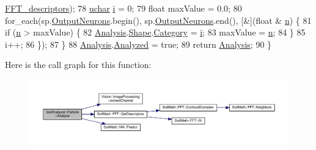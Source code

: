 \begin{DoxyCode}
      \hyperlink{class_shape_classification_afecc3c98ca8a930b359ddd936aad21f3}{FFT\_descriptors});
78     \hyperlink{_soil_math_types_8h_a65f85814a8290f9797005d3b28e7e5fc}{uchar} \hyperlink{_comparision_pictures_2_createtest_image_8m_a6f6ccfcf58b31cb6412107d9d5281426}{i} = 0;
79     \textcolor{keywordtype}{float} maxValue = 0.0;
80     for\_each(sp.\hyperlink{struct_predict__struct_aa0708cae93baa061f21452537e86d3bd}{OutputNeurons}.begin(), sp.\hyperlink{struct_predict__struct_aa0708cae93baa061f21452537e86d3bd}{OutputNeurons}.end(), [&](\textcolor{keywordtype}{float} &
      \hyperlink{_comparision_pictures_2_createtest_image_8m_aeab71244afb687f16d8c4f5ee9d6ef0e}{n}) \{
81       \textcolor{keywordflow}{if} (\hyperlink{_comparision_pictures_2_createtest_image_8m_aeab71244afb687f16d8c4f5ee9d6ef0e}{n} > maxValue) \{
82         \hyperlink{class_soil_analyzer_1_1_particle_a4df8d4d8fb130bce05fef5d4601ef89e}{Analysis}.\hyperlink{class_soil_analyzer_1_1_particle_analysis_results_a75230aa0675b2df489c08bcfffb43b97}{Shape}.\hyperlink{class_shape_classification_a5b723e358b86496ed6f4b25e2bf7af17}{Category} = \hyperlink{_comparision_pictures_2_createtest_image_8m_a6f6ccfcf58b31cb6412107d9d5281426}{i};
83         maxValue = \hyperlink{_comparision_pictures_2_createtest_image_8m_aeab71244afb687f16d8c4f5ee9d6ef0e}{n};
84       \}
85       i++;
86     \});
87   \}
88   \hyperlink{class_soil_analyzer_1_1_particle_a4df8d4d8fb130bce05fef5d4601ef89e}{Analysis}.\hyperlink{class_soil_analyzer_1_1_particle_analysis_results_abfb8465c0cfbe9a6ad4d844f6269676f}{Analyzed} = \textcolor{keyword}{true};
89   \textcolor{keywordflow}{return} \hyperlink{class_soil_analyzer_1_1_particle_a4df8d4d8fb130bce05fef5d4601ef89e}{Analysis};
90 \}
\end{DoxyCode}


Here is the call graph for this function\+:\nopagebreak
\begin{figure}[H]
\begin{center}
\leavevmode
\includegraphics[width=350pt]{class_soil_analyzer_1_1_particle_aeb4ed9f49b88f5d6563b993154aabe50_cgraph}
\end{center}
\end{figure}


